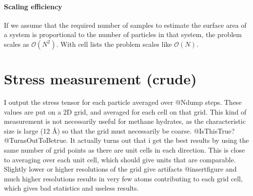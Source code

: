 \paragraph{Scaling efficiency}
If we assume that the required number of samples to estimate the surface area of a system is proportional to the number of particles in that system, the problem scales as $\mathcal{O}(N^2)$. With cell lists the problem scales like $\mathcal{O}(N)$.


\section{Stress measurement (crude)}
I output the stress tensor for each particle averaged over @Ndump steps. These values are put on a 2D grid, and averaged for each cell on that grid. This kind of measurement is not necessarily useful for methane hydrates, as the characteristic size is large (12 Å) so that the grid must necessarily be coarse. @IsThisTrue?@TurnsOutToBetrue. It actually turns out that i get the best results by using the same number of grid points as there are unit cells in each direction. This is close to averaging over each unit cell, which should give units that are comparable. Slightly lower or higher resolutions of the grid give artifacts @insertfigure and much higher resolutions results in very few atoms contributing to each grid cell, which gives bad statistics and useless results.